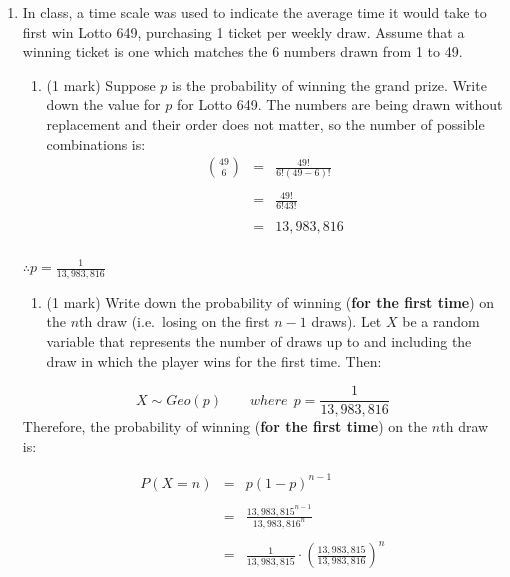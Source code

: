 \documentclass[9pt,letter]{article}
\providecommand{\tightlist}{%
  \setlength{\itemsep}{0pt}\setlength{\parskip}{0pt}}
\begin{document}
\begin{enumerate}
\def\labelenumi{\arabic{enumi}.}
\setcounter{enumi}{1}
\item
  In class, a time scale was used to indicate the average time it would
  take to first win Lotto 649, purchasing 1 ticket per weekly draw.
  Assume that a winning ticket is one which matches the 6 numbers drawn
  from 1 to 49.

  \begin{enumerate}
  \def\labelenumii{(\alph{enumii})}
  \tightlist
  \item
    (1 mark) Suppose \(p\) is the probability of winning the grand
    prize. Write down the value for \(p\) for Lotto 649. The numbers are
    being drawn without replacement and their order does not matter, so
    the number of possible combinations is: \[
    \begin{array}{rcl}
    \binom{49}{6} & = & \frac{49!}{6!(49-6)!}\\
    \\
    & = &  \frac{49!}{6!43!}\\
    \\
    & = & 13,983,816
    \\
    \end{array}
    \]
  \end{enumerate}

  \(\therefore p = \frac{1}{13,983,816}\)

  \begin{enumerate}
  \def\labelenumii{(\alph{enumii})}
  \setcounter{enumii}{1}
  \tightlist
  \item
    (1 mark) Write down the probability of winning
    (\textbf{for the first time}) on the \(n\)th draw (i.e.~losing on
    the first \(n-1\) draws). Let \(X\) be a random variable that
    represents the number of draws up to and including the draw in which
    the player wins for the first time. Then:
  \end{enumerate}

  \[
  X \sim Geo(p) \quad \quad where\ \ p = \frac{1}{13,983,816}
  \] Therefore, the probability of winning (\textbf{for the first time})
  on the \(n\)th draw is:

  \[
  \begin{array}{rcl}
  P(X=n) &=& p(1-p)^{n-1}\\
  \\
  &=& \frac{13,983,815^{n-1}}{13,983,816^{n}}\\
  \\
  &=& \frac{1}{13,983,815} \cdot (\frac{13,983,815}{13,983,816})^{n}
  \end{array}
  \]


\end{enumerate}
\end{document}

